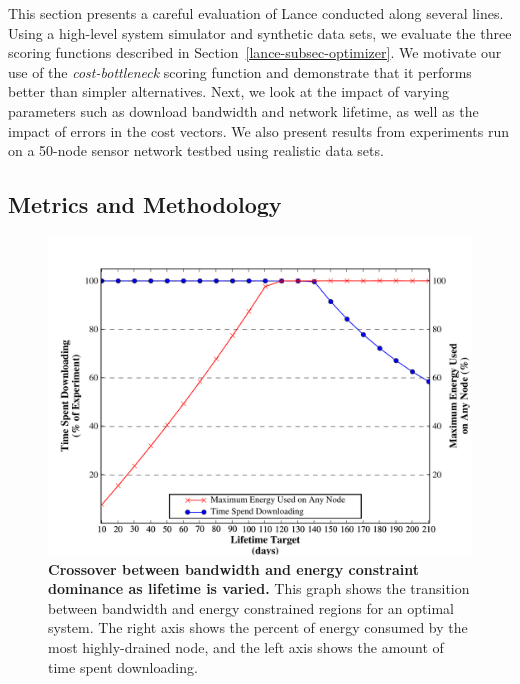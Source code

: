 This section presents a careful evaluation of Lance conducted along several
lines. Using a high-level system simulator and synthetic data sets, we
evaluate the three scoring functions described in
Section~\ref{lance-subsec-optimizer}. We motivate our use of the
\textit{cost-bottleneck} scoring function and demonstrate that it performs
better than simpler alternatives. Next, we look at the impact of varying
parameters such as download bandwidth and network lifetime, as well as the
impact of errors in the cost vectors. We also present results from
experiments run on a 50-node sensor network testbed using realistic data
sets.

\subsection{Metrics and Methodology}

\begin{figure}[t]
\begin{center}
\includegraphics[width=1.0\hsize]{./4-lance/figs/crossover.pdf}
\end{center}

\caption{\textbf{Crossover between bandwidth and energy constraint dominance
as lifetime is varied.} This graph shows the transition between bandwidth and
energy constrained regions for an optimal system. The right axis shows the
percent of energy consumed by the most highly-drained node, and the left axis
shows the amount of time spent downloading.}

\label{lance-fig-crossover}
\end{figure}

